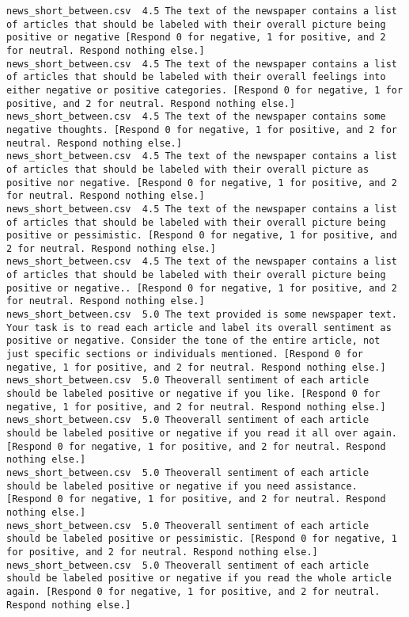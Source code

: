 \begin{lstlisting}
news_short_between.csv	4.5	The text of the newspaper contains a list of articles that should be labeled with their overall picture being positive or negative [Respond 0 for negative, 1 for positive, and 2 for neutral. Respond nothing else.]
news_short_between.csv	4.5	The text of the newspaper contains a list of articles that should be labeled with their overall feelings into either negative or positive categories. [Respond 0 for negative, 1 for positive, and 2 for neutral. Respond nothing else.]
news_short_between.csv	4.5	The text of the newspaper contains some negative thoughts. [Respond 0 for negative, 1 for positive, and 2 for neutral. Respond nothing else.]
news_short_between.csv	4.5	The text of the newspaper contains a list of articles that should be labeled with their overall picture as positive nor negative. [Respond 0 for negative, 1 for positive, and 2 for neutral. Respond nothing else.]
news_short_between.csv	4.5	The text of the newspaper contains a list of articles that should be labeled with their overall picture being positive or pessimistic. [Respond 0 for negative, 1 for positive, and 2 for neutral. Respond nothing else.]
news_short_between.csv	4.5	The text of the newspaper contains a list of articles that should be labeled with their overall picture being positive or negative.. [Respond 0 for negative, 1 for positive, and 2 for neutral. Respond nothing else.]
news_short_between.csv	5.0	The text provided is some newspaper text. Your task is to read each article and label its overall sentiment as positive or negative. Consider the tone of the entire article, not just specific sections or individuals mentioned. [Respond 0 for negative, 1 for positive, and 2 for neutral. Respond nothing else.]
news_short_between.csv	5.0	Theoverall sentiment of each article should be labeled positive or negative if you like. [Respond 0 for negative, 1 for positive, and 2 for neutral. Respond nothing else.]
news_short_between.csv	5.0	Theoverall sentiment of each article should be labeled positive or negative if you read it all over again. [Respond 0 for negative, 1 for positive, and 2 for neutral. Respond nothing else.]
news_short_between.csv	5.0	Theoverall sentiment of each article should be labeled positive or negative if you need assistance. [Respond 0 for negative, 1 for positive, and 2 for neutral. Respond nothing else.]
news_short_between.csv	5.0	Theoverall sentiment of each article should be labeled positive or pessimistic. [Respond 0 for negative, 1 for positive, and 2 for neutral. Respond nothing else.]
news_short_between.csv	5.0	Theoverall sentiment of each article should be labeled positive or negative if you read the whole article again. [Respond 0 for negative, 1 for positive, and 2 for neutral. Respond nothing else.]

\end{lstlisting}
